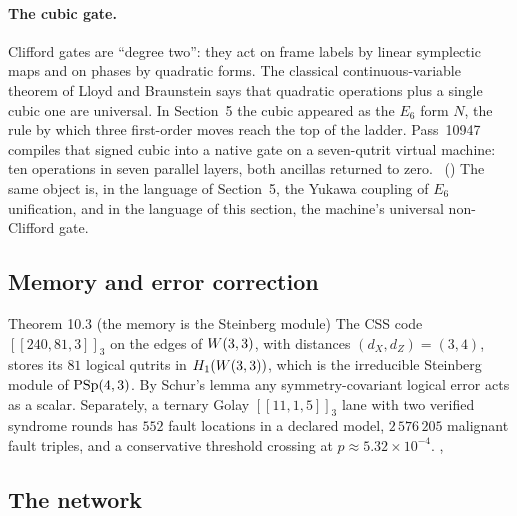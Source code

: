 \paragraph{The cubic gate.}
Clifford gates are ``degree two'': they act on frame labels by linear symplectic maps and
on phases by quadratic forms. The classical continuous-variable theorem of Lloyd and
Braunstein \cite{LloydBraunstein} says that quadratic operations plus a single cubic one are universal. In
Section~5 the cubic appeared as the $E_6$ form $N$, the rule by which three first-order moves
reach the top of the ladder. Pass~10947 compiles that signed cubic into a native gate on a
seven-qutrit virtual machine: ten operations in seven parallel layers, both ancillas returned
to zero. \tierC\ () The same object is,
in the language of Section~5, the Yukawa coupling of $E_6$ unification, and in the language of
this section, the machine's universal non-Clifford gate. \tierB

\subsection{Memory and error correction}

\begin{result}{Theorem 10.3 (the memory is the Steinberg module) \hfill \tierC}
The CSS code $[[240,81,3]]_3$ on the edges of $W(3,3)$, with distances $(d_X,d_Z)=(3,4)$,
stores its $81$ logical qutrits in $H_1(W(3,3))$, which is the irreducible Steinberg module of
$\mathrm{PSp}(4,3)$. By Schur's lemma any symmetry-covariant logical error acts as a scalar.
Separately, a ternary Golay $[[11,1,5]]_3$ lane with two verified syndrome rounds has $552$
fault locations in a declared model, $2\,576\,205$ malignant fault triples, and a conservative
threshold crossing at $p\approx5.32\times10^{-4}$.
, 
\end{result}

\subsection{The network}

